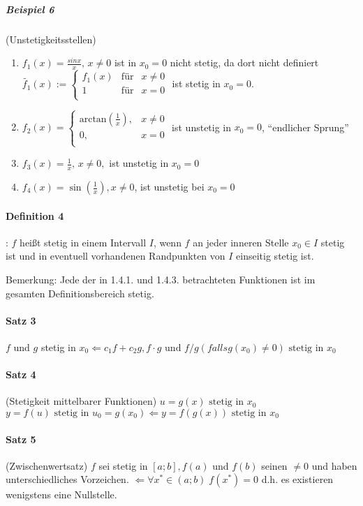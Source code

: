 \documentclass[a4paper]{scrartcl}
\begin{document}
\subparagraph{Beispiel 6} (Unstetigkeitsstellen)
\begin{enumerate}
\item $f_1(x) =\frac{sin{x}}{x}, \, x \neq 0$ ist in $x_0 = 0$ nicht stetig, da dort nicht definiert\\
$\tilde{f_1}(x) := \left\{ \begin{array}{rcl} f_1(x) & \mbox{für} & x \neq 0 \\ 1 & \mbox{für} & x = 0\\ \end{array}\right.$ ist stetig in $x_0= 0$.
\item $f_2(x) = \left\{ \begin{array}{rl} \text{arctan}(\frac{1}{x}), & x \neq 0\\ 0, & x=0\\ \end{array}\right.$ ist unstetig in $x_0 = 0$, "`endlicher Sprung"'
\item $f_3(x) = \frac{1}{x}, \, x \neq 0,$ ist unstetig in $x_0 = 0$
\item $f_4(x) = \sin{(\frac{1}{x})},x \neq 0$, ist unstetig bei $x_0 = 0$
\end{enumerate}

\paragraph{Definition 4}: $f$ heißt stetig in einem Intervall $I$, wenn $f$ an jeder inneren Stelle $x_0 \in I$ stetig ist und in eventuell vorhandenen Randpunkten von $I$ einseitig stetig ist.

Bemerkung: Jede der in 1.4.1. und 1.4.3. betrachteten Funktionen ist im gesamten Definitionsbereich stetig.

\paragraph{Satz 3} $f$ und $g$ stetig in $x_0 \Leftarrow c_1f + c_2g, f \cdot g \text{ und } f/g (falls g(x_0) \neq 0) \text{ stetig in } x_0$


\paragraph{Satz 4} (Stetigkeit mittelbarer Funktionen)
$u = g(x) \text{ stetig in } x_0$\\
$y = f(u) \text{ stetig in } u_0 = g(x_0) \Leftarrow y= f(g(x)) \text{ stetig in } x_0$

\paragraph{Satz 5} (Zwischenwertsatz)
$f$ sei stetig in $[a;b], f(a)$ und $f(b)$ seinen $\neq 0$ und haben unterschiedliches Vorzeichen. $\Leftarrow \forall x^* \in (a;b) \; f(x^*)=0$ d.h. es existieren wenigstens eine Nullstelle.
\end{document}
